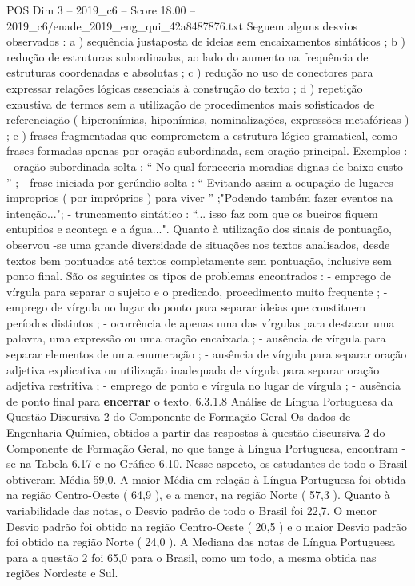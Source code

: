 \begin{textsample}{POS Dim 3 – 2019\_c6 – Score 18.00 – 2019\_c6/enade\_2019\_eng\_qui\_42a8487876.txt}
Seguem alguns desvios observados : a ) sequência justaposta de ideias sem encaixamentos sintáticos ; b ) redução de estruturas subordinadas, ao lado do aumento na frequência de estruturas coordenadas e absolutas ; c ) redução no uso de conectores para expressar relações lógicas essenciais à construção do texto ; d ) repetição exaustiva de termos sem a utilização de procedimentos mais sofisticados de referenciação ( hiperonímias, hiponímias, nominalizações, expressões metafóricas ) ; e ) frases fragmentadas que comprometem a estrutura lógico-gramatical, como frases formadas apenas por oração subordinada, sem oração principal.
Exemplos : - oração subordinada solta : “ No qual forneceria moradias dignas de baixo custo ” ; - frase iniciada por gerúndio solta : “ Evitando assim a ocupação de lugares improprios ( por impróprios ) para viver ” ;"Podendo também fazer eventos na intenção..."; - truncamento sintático : “... isso faz com que os bueiros fiquem entupidos e aconteça e a água...".
Quanto à utilização dos sinais de pontuação, observou -se uma grande diversidade de situações nos textos analisados, desde textos bem pontuados até textos completamente sem pontuação, inclusive sem ponto final.
São os seguintes os tipos de problemas encontrados : - emprego de vírgula para separar o sujeito e o predicado, procedimento muito frequente ; - emprego de vírgula no lugar do ponto para separar ideias que constituem períodos distintos ; - ocorrência de apenas uma das vírgulas para destacar uma palavra, uma expressão ou uma oração encaixada ; - ausência de vírgula para separar elementos de uma enumeração ; - ausência de vírgula para separar oração adjetiva explicativa ou utilização inadequada de vírgula para separar oração adjetiva restritiva ; - emprego de ponto e vírgula no lugar de vírgula ; - ausência de ponto final para \textbf{encerrar} o texto. 6.3.1.8 Análise de Língua Portuguesa da Questão Discursiva 2 do Componente de Formação Geral Os dados de Engenharia Química, obtidos a partir das respostas à questão discursiva 2 do Componente de Formação Geral, no que tange à Língua Portuguesa, encontram -se na Tabela 6.17 e no Gráfico 6.10.
Nesse aspecto, os estudantes de todo o Brasil obtiveram Média 59,0.
A maior Média em relação à Língua Portuguesa foi obtida na região Centro-Oeste ( 64,9 ), e a menor, na região Norte ( 57,3 ).
Quanto à variabilidade das notas, o Desvio padrão de todo o Brasil foi 22,7.
O menor Desvio padrão foi obtido na região Centro-Oeste ( 20,5 ) e o maior Desvio padrão foi obtido na região Norte ( 24,0 ).
A Mediana das notas de Língua Portuguesa para a questão 2 foi 65,0 para o Brasil, como um todo, a mesma obtida nas regiões Nordeste e Sul.

\end{textsample}
